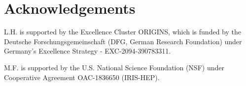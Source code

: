 \section*{Acknowledgements}\label{sec:acknowledgements}

L.H. is supported by the Excellence Cluster ORIGINS, which is funded by the Deutsche Forschungsgemeinschaft (DFG, German Research Foundation) under Germany's Excellence Strategy - EXC-2094-390783311.

M.F. is supported by the U.S. National Science Foundation (NSF) under Cooperative Agreement OAC-1836650 (IRIS-HEP).
